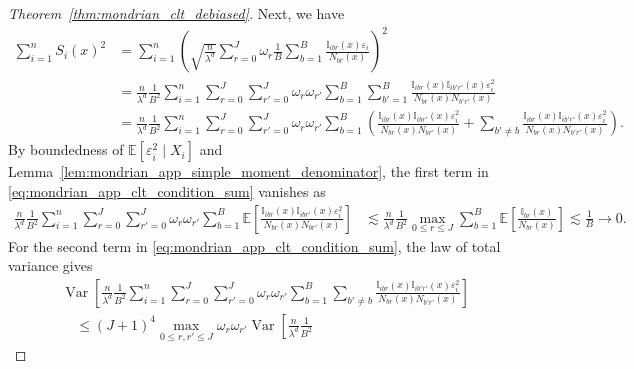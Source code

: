 \documentclass[11pt,lof]{puthesis}
\newcommand{\E}{\ensuremath{\mathbb{E}}}
\newcommand{\I}{\ensuremath{\mathbb{I}}}
\DeclareMathOperator{\Var}{Var}
\theoremstyle{break}
\theoremstyle{proof}
\newtheorem{proof}{Proof}
\begin{document}
\begin{proof}[Theorem~\ref{thm:mondrian_clt_debiased}]
  Next, we have
  \begin{align}
    \label{eq:mondrian_app_clt_condition_sum}
    \sum_{i=1}^n
    S_i(x)^2
    &=
    \sum_{i=1}^n
    \left(
      \sqrt{\frac{n}{\lambda^d}}
      \sum_{r=0}^{J}
      \omega_r
      \frac{1}{B} \sum_{b=1}^B
      \frac{\I_{i b r}(x) \varepsilon_i} {N_{b r}(x)}
    \right)^2 \\
    &=
    \nonumber
    \frac{n}{\lambda^d}
    \frac{1}{B^2}
    \sum_{i=1}^n
    \sum_{r=0}^{J}
    \sum_{r'=0}^{J}
    \omega_r
    \omega_{r'}
    \sum_{b=1}^B
    \sum_{b'=1}^B
    \frac{\I_{i b r}(x) \I_{i b' r'}(x) \varepsilon_i^2}
    {N_{b r}(x) N_{b' r'}(x)} \\
    \nonumber
    &=
    \frac{n}{\lambda^d}
    \frac{1}{B^2}
    \sum_{i=1}^n
    \sum_{r=0}^{J}
    \sum_{r'=0}^{J}
    \omega_r
    \omega_{r'}
    \sum_{b=1}^B
    \left(
      \frac{\I_{i b r}(x) \I_{i b r'}(x) \varepsilon_i^2}
      {N_{b r}(x) N_{b r'}(x)}
      + \sum_{b' \neq b}
      \frac{\I_{i b r}(x) \I_{i b' r'}(x) \varepsilon_i^2}
      {N_{b r}(x) N_{b' r'}(x)}
    \right).
  \end{align}
  By boundedness of $\E[\varepsilon_i^2 \mid X_i]$
  and Lemma~\ref{lem:mondrian_app_simple_moment_denominator},
  the first term in \eqref{eq:mondrian_app_clt_condition_sum}
  vanishes as
  \begin{align*}
    \frac{n}{\lambda^d}
    \frac{1}{B^2}
    \sum_{i=1}^n
    \sum_{r=0}^{J}
    \sum_{r'=0}^{J}
    \omega_r
    \omega_{r'}
    \sum_{b=1}^B
    \E \left[
      \frac{\I_{i b r}(x) \I_{i b r'}(x) \varepsilon_i^2}
      {N_{b r}(x) N_{b r'}(x)}
    \right]
    &\lesssim
    \frac{n}{\lambda^d}
    \frac{1}{B^2}
    \max_{0 \leq r \leq J}
    \sum_{b=1}^B
    \E \left[
      \frac{\I_{b r}(x)}{N_{b r}(x)}
    \right]
    \lesssim
    \frac{1}{B}
    \to 0.
  \end{align*}
  For the second term in \eqref{eq:mondrian_app_clt_condition_sum},
  the law of total variance gives
  \begin{align}
    \nonumber
    &\Var \left[
      \frac{n}{\lambda^d}
      \frac{1}{B^2}
      \sum_{i=1}^n
      \sum_{r=0}^{J}
      \sum_{r'=0}^{J}
      \omega_r
      \omega_{r'}
      \sum_{b=1}^B
      \sum_{b' \neq b}
      \frac{\I_{i b r}(x) \I_{i b' r'}(x) \varepsilon_i^2}
      {N_{b r}(x) N_{b' r'}(x)}
    \right] \\
    \nonumber
    &\quad\leq
    (J+1)^4
    \max_{0 \leq r, r' \leq J}
    \omega_r
    \omega_{r'}
    \Var \left[
      \frac{n}{\lambda^d}
      \frac{1}{B^2}

\end{align}
\end{proof}
\end{document}
